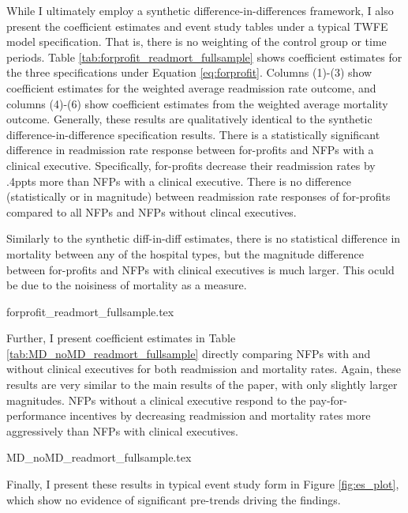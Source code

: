 \documentclass[12pt]{article}
\begin{document}
While I ultimately employ a synthetic difference-in-differences framework, I also present the coefficient estimates and event study tables under a typical TWFE model specification. That is, there is no weighting of the control group or time periods. Table \ref{tab:forprofit_readmort_fullsample} shows coefficient estimates for the three specifications under Equation \ref{eq:forprofit}. Columns (1)-(3) show coefficient estimates for the weighted average readmission rate outcome, and columns (4)-(6) show coefficient estimates from the weighted average mortality outcome. Generally, these results are qualitatively identical to the synthetic difference-in-difference specification results. There is a statistically significant difference in readmission rate response between for-profits and NFPs with a clinical executive. Specifically, for-profits decrease their readmission rates by .4ppts more than NFPs with a clinical executive. There is no difference (statistically or in magnitude) between readmission rate responses of for-profits compared to all NFPs and NFPs without clincal executives. 

Similarly to the synthetic diff-in-diff estimates, there is no statistical difference in mortality between any of the hospital types, but the magnitude difference between for-profits and NFPs with clinical executives is much larger. This oculd be due to the noisiness of mortality as a measure. 

{forprofit_readmort_fullsample.tex}

Further, I present coefficient estimates in Table \ref{tab:MD_noMD_readmort_fullsample} directly comparing NFPs with and without clinical executives for both readmission and mortality rates. Again, these results are very similar to the main results of the paper, with only slightly larger magnitudes. NFPs without a clinical executive respond to the pay-for-performance incentives by decreasing readmission and mortality rates more aggressively than NFPs with clinical executives. 

{MD_noMD_readmort_fullsample.tex}

Finally, I present these results in typical event study form in Figure \ref{fig:es_plot}, which show no evidence of significant pre-trends driving the findings. 
\end{document}
